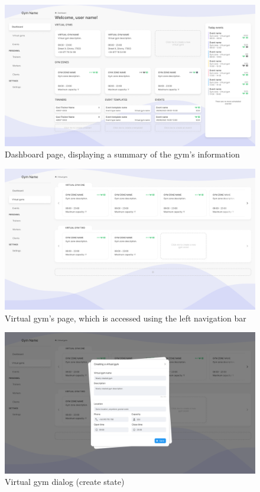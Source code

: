 \documentclass[a4paper, 12pt, oneside]{book}
\begin{document}
\begin{figure}[h!]
	\centering
	\includegraphics[width=\textwidth]{assets/ui/Dashboard.png}
	\caption{Dashboard page, displaying a summary of the gym's information}
\end{figure}
\begin{figure}[h!]
	\centering
	\includegraphics[width=\textwidth]{assets/ui/VirtualGyms.png}
	\caption{Virtual gym's page, which is accessed using the left navigation bar}
\end{figure}
\begin{figure}[h!]
	\centering
	\includegraphics[width=\textwidth]{assets/ui/CreateVirtualGym.png}
	\caption{Virtual gym dialog (create state)}
\end{figure}
\end{document}
